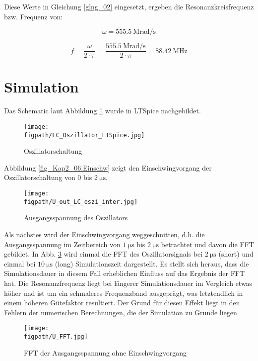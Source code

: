 Diese Werte in Gleichung \ref{glng_02} eingesetzt, ergeben die Resonanzkreisfrequenz bzw. Frequenz von:

\begin{equation}
    \omega = \SI{555.5}{\mega \radian \per \second}
\end{equation}

\begin{equation}
    f = \frac{\omega}{2 \cdot \pi} = \frac{\SI{555.5}{\mega \radian \per \second}}{2 \cdot \pi} = \SI{88.42}{\mega \hertz}
\end{equation}


\section{Simulation}
Das Schematic laut Abbildung \ref{fig_Kap2_05:LTSpiceSchematic} wurde in LTSpice nachgebildet.

\begin{figure}[H]
    \centering
    \texttt{[image: \\figpath/LC\_Oszillator\_LTSpice.jpg]}
    \caption{Oszillatorschaltung}
    \label{fig_Kap2_05:LTSpiceSchematic}
\end{figure}

Abbildung \ref{fig_Kap2_06:Einschw} zeigt den Einschwingvorgang der Oszillatorschaltung von 0 bis $\SI{2}{\micro\second}$. 

\begin{figure}[H]
	\centering \small
	\texttt{[image: \\figpath/U\_out\_LC\_oszi\_inter.jpg]}
	\caption{Ausgangsspannung des Oszillators}
	\label{fig_Kap2_06:Uout}
\end{figure}

Als nächstes wird der Einschwingvorgang weggeschnitten, d.h. die Ausgangsspannung im Zeitbereich von $\SI{1}{\micro\second}$ bis $\SI{2}{\micro\second}$ betrachtet und davon die FFT gebildet. In Abb. \ref{fig_Kap2_07:FFT} wird einmal die FFT des Oszillatorsignals bei $\SI{2}{\micro\second}$ (short) und einmal bei $\SI{10}{\micro\second}$ (long) Simulationszeit dargestellt. Es stellt sich heraus, dass die Simulationsdauer in diesem Fall erheblichen Einfluss auf das Ergebnis der FFT hat. Die Resonanzfrequenz liegt bei längerer Simulationsdauer im Vergleich etwas höher und ist um ein schmaleres Frequenzband ausgeprägt, was letztendlich in einem höheren Gütefaktor resultiert. Der Grund für diesen Effekt liegt in den Fehlern der numerischen Berechnungen, die der Simulation zu Grunde liegen.

\begin{figure}[H]
    \centering
    \texttt{[image: \\figpath/U\_FFT.jpg]}
    \caption{FFT der Ausgangsspannung ohne Einschwingvorgang}
    \label{fig_Kap2_07:FFT}
\end{figure}

